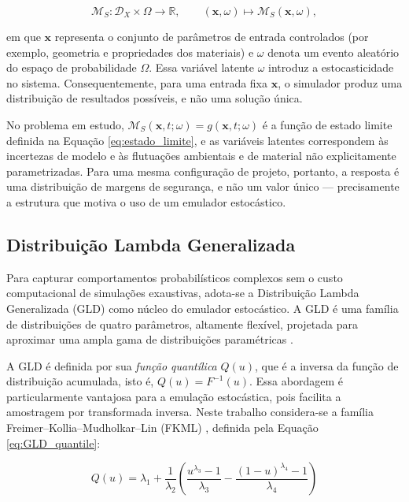 \begin{equation}\label{eq:simulador_estocastico}
\mathcal{M}_S : \mathcal{D}_X \times \Omega \rightarrow \mathbb{R}, \qquad (\mathbf{x}, \omega) \mapsto \mathcal{M}_S(\mathbf{x}, \omega),
\end{equation}

em que $\mathbf{x}$ representa o conjunto de parâmetros de entrada controlados (por exemplo, geometria e propriedades dos materiais) e $\omega$ denota um evento aleatório do espaço de probabilidade $\Omega$. Essa variável latente $\omega$ introduz a estocasticidade no sistema. Consequentemente, para uma entrada fixa $\mathbf{x}$, o simulador produz uma distribuição de resultados possíveis, e não uma solução única.

No problema em estudo, $\mathcal{M}_S(\mathbf{x}, t; \omega) = g(\mathbf{x}, t; \omega)$ é a função de estado limite definida na Equação \eqref{eq:estado_limite}, e as variáveis latentes correspondem às incertezas de modelo e às flutuações ambientais e de material não explicitamente parametrizadas. Para uma mesma configuração de projeto, portanto, a resposta é uma distribuição de margens de segurança, e não um valor único --- precisamente a estrutura que motiva o uso de um emulador estocástico.

\subsection{Distribuição Lambda Generalizada}

Para capturar comportamentos probabilísticos complexos sem o custo computacional de simulações exaustivas, adota-se a Distribuição Lambda Generalizada (GLD) como núcleo do emulador estocástico. A GLD é uma família de distribuições de quatro parâmetros, altamente flexível, projetada para aproximar uma ampla gama de distribuições paramétricas \cite{KarianDudewicz2000, ZhuSudret2021}.

A GLD é definida por sua \textit{função quantílica} $Q(u)$, que é a inversa da função de distribuição acumulada, isto é, $Q(u) = F^{-1}(u)$. Essa abordagem é particularmente vantajosa para a emulação estocástica, pois facilita a amostragem por transformada inversa. Neste trabalho considera-se a família Freimer--Kollia--Mudholkar--Lin (FKML) \cite{Freimer1988}, definida pela Equação \eqref{eq:GLD_quantile}:

\begin{equation}\label{eq:GLD_quantile}
Q(u) = \lambda_1 + \frac{1}{\lambda_2} \left( \frac{u^{\lambda_3} - 1}{\lambda_3} - \frac{(1 - u)^{\lambda_4} - 1}{\lambda_4} \right)
\end{equation}

